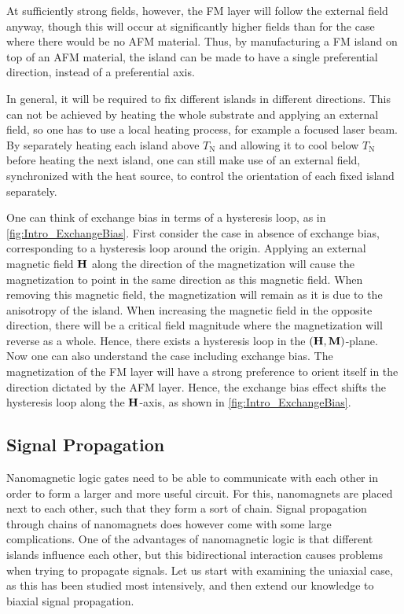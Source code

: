\documentclass[11pt,a4paper,english]{article}
\begin{document}
At sufficiently strong fields, however, the FM layer will follow the external field anyway, though this will occur at significantly higher fields than for the case where there would be no AFM material. Thus, by manufacturing a FM island on top of an AFM material, the island can be made to have a single preferential direction, instead of a preferential axis. \par
In general, it will be required to fix different islands in different directions. This can not be achieved by heating the whole substrate and applying an external field, so one has to use a local heating process, for example a focused laser beam. By separately heating each island above $T_\mathrm{N}$ and allowing it to cool below $T_\mathrm{N}$ before heating the next island, one can still make use of an external field, synchronized with the heat source, to control the orientation of each fixed island separately. \par
One can think of exchange bias in terms of a hysteresis loop, as in \cref{fig:Intro_ExchangeBias}. First consider the case in absence of exchange bias, corresponding to a hysteresis loop around the origin. Applying an external magnetic field $\vb{H}$ along the direction of the magnetization will cause the magnetization to point in the same direction as this magnetic field. When removing this magnetic field, the magnetization will remain as it is due to the anisotropy of the island. When increasing the magnetic field in the opposite direction, there will be a critical field magnitude where the magnetization will reverse as a whole. Hence, there exists a hysteresis loop in the $(\vb{H}, \vb{M})$-plane. Now one can also understand the case including exchange bias. The magnetization of the FM layer will have a strong preference to orient itself in the direction dictated by the AFM layer. Hence, the exchange bias effect shifts the hysteresis loop along the $\vb{H}$-axis, as shown in \cref{fig:Intro_ExchangeBias}.

\subsection{Signal Propagation}
Nanomagnetic logic gates need to be able to communicate with each other in order to form a larger and more useful circuit. For this, nanomagnets are placed next to each other, such that they form a sort of chain. Signal propagation through chains of nanomagnets does however come with some large complications. One of the advantages of nanomagnetic logic is that different islands influence each other, but this bidirectional interaction causes problems when trying to propagate signals. Let us start with examining the uniaxial case, as this has been studied most intensively, and then extend our knowledge to biaxial signal propagation.
\end{document}
